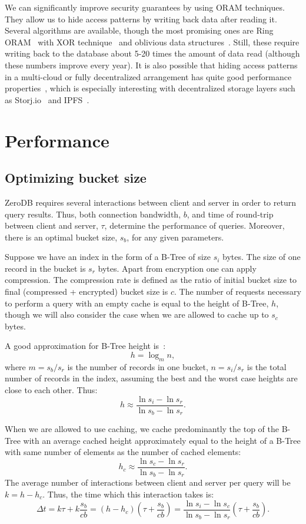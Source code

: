 \documentclass[notitlepage,longbibliography]{revtex4-1}
\begin{document}
We can significantly improve security guarantees by using ORAM techniques.
They allow us to hide access patterns by writing back data after reading it.
Several algorithms are available, though the most promising ones are Ring ORAM~\cite{practical-oram} with XOR technique~\cite{burst-oram}
and oblivious data structures~\cite{ods-wang-2014}.
Still, these require writing back to the database about 5-20 times the amount of data read (although these numbers improve every year).
It is also possible that hiding access patterns in a multi-cloud or fully decentralized arrangement has quite good performance properties~\cite{oram-multicloud},
which is especially interesting with decentralized storage layers such as Storj.io~\cite{storj} and IPFS~\cite{ipfs}.

\section{Performance}

\subsection{Optimizing bucket size}


ZeroDB requires several interactions between client and server in order to return query results.
Thus, both connection bandwidth, $b$, and time of round-trip between client and server, $\tau$, determine the performance of queries.
Moreover, there is an optimal bucket size, $s_b$, for any given parameters.

Suppose we have an index in the form of a B-Tree of size $s_i$ bytes.
The size of one record in the bucket is $s_r$ bytes.
Apart from encryption one can apply compression.
The compression rate is defined as the ratio of initial bucket size to final (compressed + encrypted) bucket size is $c$.
The number of requests necessary to perform a query with an empty cache is equal to the height of B-Tree, $h$, though we will also consider the case when we are allowed to cache up to $s_c$ bytes.


A good approximation for B-Tree height is~\cite{wiki:b-tree}:
$$h = \log_m n,$$
where $m = s_b/s_r$ is the number of records in one bucket,
$n = s_i/s_r$ is the total number of records in the index,
assuming the best and the worst case heights are close to each other.
Thus:
$$h \approx \frac{\ln s_i - \ln s_r}{\ln s_b - \ln s_r}.$$

When we are allowed to use caching, we cache predominantly the top of the B-Tree with an average cached height approximately equal to the height of a B-Tree with same number of elements as the number of cached elements:
$$h_c \approx \frac{\ln s_c - \ln s_r}{\ln s_b - \ln s_r}.$$
The average number of interactions between client and server per query will be $k = h - h_c$.
Thus, the time which this interaction takes is:
$$\Delta t = k\tau + k\frac{s_b}{cb} =
\left(h - h_c \right) \left( \tau + \frac{s_b}{cb} \right) =
\frac{\ln s_i - \ln s_c}{\ln s_b - \ln s_r} \left( \tau + \frac{s_b}{cb} \right).$$
\end{document}
